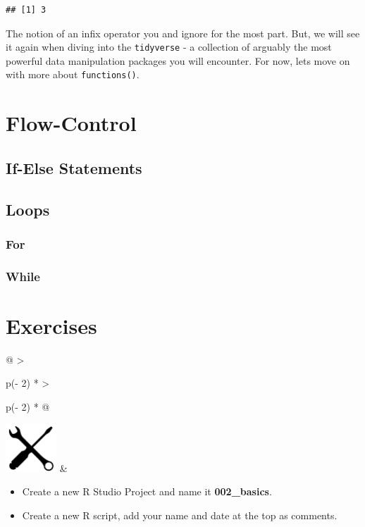 \documentclass[
]{book}
\begin{document}
\begin{verbatim}
## [1] 3
\end{verbatim}

The notion of an infix operator you and ignore for the most part. But, we will see it again when diving into the \texttt{tidyverse} - a collection of arguably the most powerful data manipulation packages you will encounter. For now, lets move on with more about \texttt{functions()}.

\hypertarget{flow-control}{%
\section{Flow-Control}\label{flow-control}}

\hypertarget{if-else-statements}{%
\subsection{If-Else Statements}\label{if-else-statements}}

\hypertarget{loops}{%
\subsection{Loops}\label{loops}}

\hypertarget{for}{%
\subsubsection{For}\label{for}}

\hypertarget{while}{%
\subsubsection{While}\label{while}}

\hypertarget{exercises-1}{%
\section*{Exercises}\label{exercises-1}}

\begin{longtable}[]{@{}
  >{\raggedright\arraybackslash}p{(\columnwidth - 2\tabcolsep) * }
  >{\raggedright\arraybackslash}p{(\columnwidth - 2\tabcolsep) * }@{}}
\toprule\noalign{}
\endhead
\bottomrule\noalign{}
\endlastfoot
\includegraphics[width=\textwidth,height=0.70833in]{images/07.png} & \begin{minipage}[t]{\linewidth}\raggedright
\begin{itemize}
\item
  Create a new R Studio Project and name it \textbf{002\_basics}.
\item
  Create a new R script, add your name and date at the top as comments.
\end{itemize}
\end{minipage} \\
\end{longtable}
\end{document}
